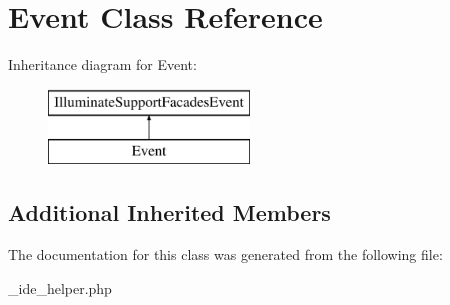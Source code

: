 \hypertarget{class_event}{}\section{Event Class Reference}
\label{class_event}
Inheritance diagram for Event\+:\begin{figure}[H]
\begin{center}
\leavevmode
\includegraphics[height=2.000000cm]{class_event}
\end{center}
\end{figure}
\subsection*{Additional Inherited Members}


The documentation for this class was generated from the following file\+:\begin{DoxyCompactItemize}
\item 
\+\_\+ide\+\_\+helper.\+php\end{DoxyCompactItemize}
